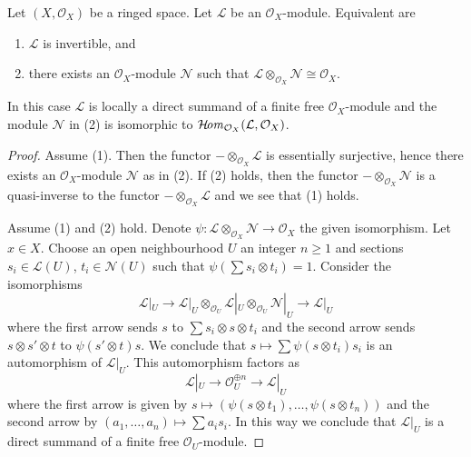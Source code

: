 \begin{lemma}
\label{lemma-invertible}
Let $(X, \mathcal{O}_X)$ be a ringed space. Let $\mathcal{L}$
be an $\mathcal{O}_X$-module. Equivalent are
\begin{enumerate}
\item $\mathcal{L}$ is invertible, and
\item there exists an $\mathcal{O}_X$-module $\mathcal{N}$
such that
$\mathcal{L} \otimes_{\mathcal{O}_X} \mathcal{N} \cong \mathcal{O}_X$.
\end{enumerate}
In this case $\mathcal{L}$ is locally a direct summand of a finite free
$\mathcal{O}_X$-module and the module $\mathcal{N}$ in (2) is isomorphic to
$\mathop{\mathcal{H}\!\mathit{om}}\nolimits_{\mathcal{O}_X}(\mathcal{L}, \mathcal{O}_X)$.
\end{lemma}

\begin{proof}
Assume (1). Then the functor $- \otimes_{\mathcal{O}_X} \mathcal{L}$
is essentially surjective, hence there exists an $\mathcal{O}_X$-module
$\mathcal{N}$ as in (2). If (2) holds, then the functor
$- \otimes_{\mathcal{O}_X} \mathcal{N}$ is a quasi-inverse
to the functor $- \otimes_{\mathcal{O}_X} \mathcal{L}$ and
we see that (1) holds.

\medskip\noindent
Assume (1) and (2) hold. Denote
$\psi : \mathcal{L} \otimes_{\mathcal{O}_X} \mathcal{N} \to \mathcal{O}_X$
the given isomorphism. Let $x \in X$. Choose an open neighbourhood
$U$ an integer $n \geq 1$ and sections $s_i \in \mathcal{L}(U)$,
$t_i \in \mathcal{N}(U)$ such that $\psi(\sum s_i \otimes t_i) = 1$.
Consider the isomorphisms
$$
\mathcal{L}|_U \to
\mathcal{L}|_U \otimes_{\mathcal{O}_U}
\mathcal{L}|_U \otimes_{\mathcal{O}_U} \mathcal{N}|_U \to \mathcal{L}|_U
$$
where the first arrow sends $s$ to $\sum s_i \otimes s \otimes t_i$
and the second arrow sends $s \otimes s' \otimes t$ to $\psi(s' \otimes t)s$.
We conclude that $s \mapsto \sum \psi(s \otimes t_i)s_i$ is
an automorphism of $\mathcal{L}|_U$. This automorphism factors as
$$
\mathcal{L}|_U \to \mathcal{O}_U^{\oplus n} \to \mathcal{L}|_U
$$
where the first arrow is given by
$s \mapsto (\psi(s \otimes t_1), \ldots, \psi(s \otimes t_n))$
and the second arrow by $(a_1, \ldots, a_n) \mapsto \sum a_i s_i$.
In this way we conclude that $\mathcal{L}|_U$ is a direct summand
of a finite free $\mathcal{O}_U$-module.


\end{proof}
